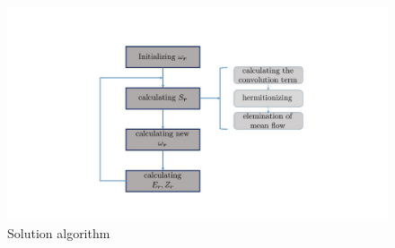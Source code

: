 \documentclass[10pt]{article}
\begin{document}
%
\begin{figure}
\centering
\includegraphics[scale=0.5]{algorithm}
\caption{Solution algorithm}\label{Fig-2}
\end{figure}
%
\end{document}
